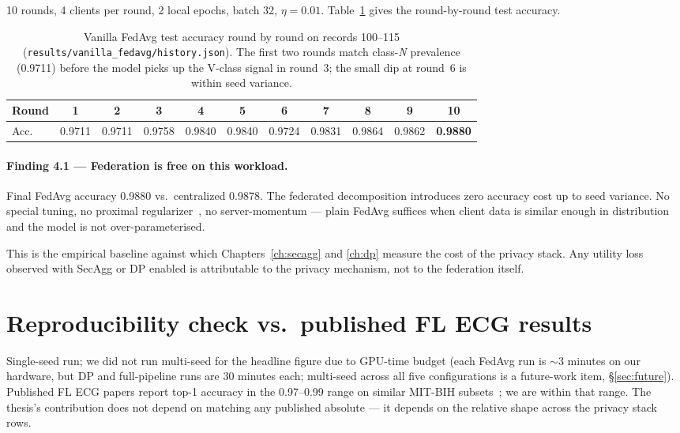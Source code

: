 \documentclass[11pt,a4paper]{report}
\begin{document}
10 rounds, 4 clients per round, 2 local epochs, batch 32, $\eta = 0.01$.
Table~\ref{tab:fedavg-convergence} gives the round-by-round test accuracy.

\begin{table}[h]
  \centering
  \caption{Vanilla FedAvg test accuracy round by round on records
  100--115 (\texttt{results/vanilla\_fedavg/history.json}). The first two
  rounds match class-\emph{N} prevalence (0.9711) before the model picks
  up the V-class signal in round~3; the small dip at round~6 is within
  seed variance.}
  \label{tab:fedavg-convergence}
  \begin{tabular}{lcccccccccc}
    \toprule
    Round & 1 & 2 & 3 & 4 & 5 & 6 & 7 & 8 & 9 & 10 \\
    \midrule
    Acc.\ & 0.9711 & 0.9711 & 0.9758 & 0.9840 & 0.9840 & 0.9724 & 0.9831 & 0.9864 & 0.9862 & \textbf{0.9880} \\
    \bottomrule
  \end{tabular}
\end{table}

\paragraph{Finding 4.1 --- Federation is free on this workload.}
Final FedAvg accuracy 0.9880 vs.\ centralized 0.9878.
The federated decomposition introduces zero accuracy cost up to seed
variance. No special tuning, no proximal regularizer~\cite{li2020fedprox}, no
server-momentum --- plain FedAvg suffices when client data is similar enough
in distribution and the model is not over-parameterised.

This is the empirical baseline against which Chapters~\ref{ch:secagg} and
\ref{ch:dp} measure the cost of the privacy stack. Any utility loss observed
with SecAgg or DP enabled is attributable to the privacy mechanism, not to
the federation itself.

\section{Reproducibility check vs.\ published FL ECG results}

Single-seed run; we did not run multi-seed for the headline figure due to
GPU-time budget (each FedAvg run is $\sim$3 minutes on our hardware, but
DP and full-pipeline runs are 30 minutes each; multi-seed across all
five configurations is a future-work item, \S\ref{sec:future}). Published FL
ECG papers report top-1 accuracy in the 0.97--0.99 range on similar MIT-BIH
subsets~\cite{kachuee2018ecg}; we are within that range. The thesis's
contribution does not depend on matching any published absolute --- it
depends on the relative shape across the privacy stack rows.
\end{document}
